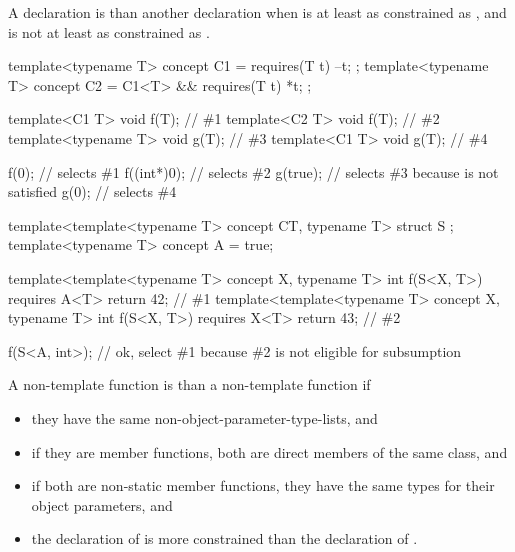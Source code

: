 \pnum
A declaration  is 
than another declaration  when  is at least as
constrained as , and  is not at least as
constrained as .
\begin{example}
\begin{codeblock}
template<typename T> concept C1 = requires(T t) { --t; };
template<typename T> concept C2 = C1<T> && requires(T t) { *t; };

template<C1 T> void f(T);       // \#1
template<C2 T> void f(T);       // \#2
template<typename T> void g(T); // \#3
template<C1 T> void g(T);       // \#4

f(0);                           // selects \#1
f((int*)0);                     // selects \#2
g(true);                        // selects \#3 because  is not satisfied
g(0);                           // selects \#4
\end{codeblock}
\end{example}
\begin{example}
\begin{codeblock}
template<template<typename T> concept CT, typename T>
struct S {};
template<typename T>
concept A = true;

template<template<typename T> concept X, typename T>
int f(S<X, T>) requires A<T> { return 42; }             // \#1
template<template<typename T> concept X, typename T>
int f(S<X, T>) requires X<T> { return 43; }             // \#2

f(S<A, int>{});                 // ok, select \#1 because \#2 is not eligible for subsumption
\end{codeblock}
\end{example}

\pnum
A non-template function  is 
than a non-template function  if
\begin{itemize}
\item
they have the same non-object-parameter-type-lists, and
\item
if they are member functions, both are direct members of the same class, and
\item
if both are non-static member functions,
they have the same types for their object parameters, and
\item
the declaration of  is more constrained than
the declaration of .
\end{itemize}

